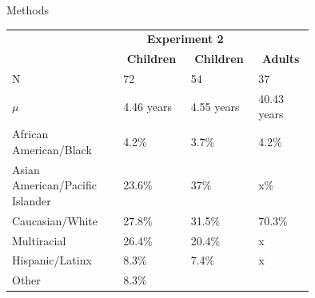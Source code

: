 \documentclass[final]{beamer}
\newlength{\colwidth}
\begin{document}
\begin{frame}[t]
\begin{columns}[t]
\begin{column}{\colwidth}
\begin{block}{Methods}
    \begin{itemize}
      \begin{table}[ht]
        \centering
        \begin{tabular}{|p{0.3\linewidth}|p{0.15\linewidth}|p{0.15\linewidth}| p{0.15\linewidth}|}
          \hline
          \right
          \rowcolor{cardinalred!80}
          \multicolumn{2}{|c|}{\textbf{Experiment 1}} & \multicolumn{2}{c|}{\textbf{Experiment 2}} \\
          \cline{2-4}
          \rowcolor{cardinalred!80}
          \multicolumn{1}{|c|}{\textbf{}} &
          \multicolumn{1}{|c|}{\textbf{Children}} & 
          \multicolumn{1}{|c|}{\textbf{Children}} & 
          \multicolumn{1}{|c|}{\textbf{Adults}} \\
          \hline
          N & 72 & 54 & 37 \\
          \hline
          \rowcolor{cardinalred!40}
          $\mu$ & 4.46 years & 4.55 years & 40.43 years \\
          \hline
          \raggedright African American/Black & 4.2\% & 3.7\% & 4.2\% \\ 
          \hline
          \rowcolor{cardinalred!40}
          \raggedright Asian American/Pacific Islander & 23.6\% & 37\% & x\% \\
          \hline
          Caucasian/White & 27.8\% & 31.5\% & 70.3\% \\
          \hline
          \rowcolor{cardinalred!40}
          Multiracial & 26.4\% & 20.4\% & x \\
          \hline
          Hispanic/Latinx & 8.3\% & 7.4\% & x \\
          \hline
          \rowcolor{cardinalred!40}
          Other & 8.3\% & & \\
          \hline
        \end{tabular}
      \end{table}         
    
    \end{itemize} 


\end{block}
\end{column}
\end{columns}
\end{frame}
\end{document}
